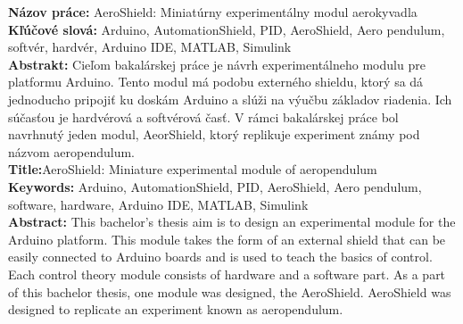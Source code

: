 \noindent
\textbf{Názov práce:} AeroShield: Miniatúrny experimentálny modul aerokyvadla\\
\textbf{Kľúčové slová: } Arduino, AutomationShield, PID, AeroShield, Aero pendulum, softvér, hardvér, Arduino IDE, MATLAB, Simulink \\
\textbf{Abstrakt: } Cieľom bakalárskej práce je návrh experimentálneho modulu pre platformu Arduino. Tento modul má podobu externého shieldu, ktorý sa dá jednoducho pripojiť ku doskám Arduino a slúži na výučbu základov riadenia. Ich súčasťou je hardvérová a softvérová časť. V rámci bakalárskej práce bol navrhnutý jeden modul, AeorShield, ktorý replikuje experiment známy pod názvom aeropendulum.\\

\noindent
\textbf{Title:}AeroShield: Miniature experimental module of aeropendulum \\
\textbf{Keywords: }  Arduino, AutomationShield, PID, AeroShield, Aero pendulum, software, hardware, Arduino IDE, MATLAB, Simulink\\
\textbf{Abstract: } This bachelor's thesis aim is to design an experimental module for the Arduino platform. This module takes the form of an external shield that can be easily connected to Arduino boards and is used to teach the basics of control. Each control theory module consists of hardware and a software part. As a part of this bachelor thesis, one module was designed, the AeroShield. AeroShield was designed to replicate an experiment known as aeropendulum.
\cleardoublepage
